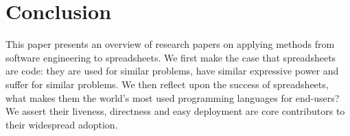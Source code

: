 \documentclass[conference]{IEEEtran}
\begin{document}
\section{Conclusion}
This paper presents an overview of research papers on applying methods from software engineering to spreadsheets. We first make the case that spreadsheets are code: they are used for similar problems, have similar expressive power and suffer for similar problems. We then reflect upon the success of spreadsheets, what makes them the world's most used programming languages for end-users? We assert their liveness, directness and easy deployment are core contributors to their widespread adoption. 












\end{document}
